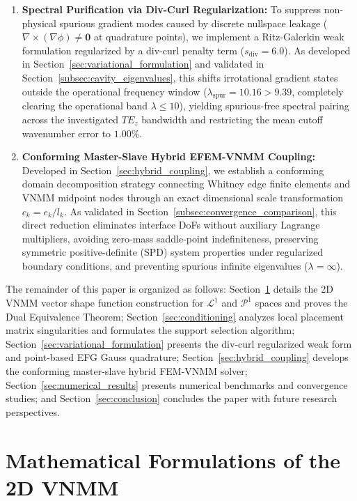 \documentclass[preprint,12pt]{elsarticle}
\begin{document}
\begin{enumerate}
    \item \textbf{Spectral Purification via Div-Curl Regularization:} To suppress non-physical spurious gradient modes caused by discrete nullspace leakage ($\nabla \times (\nabla \phi) \neq \mathbf{0}$ at quadrature points), we implement a Ritz-Galerkin weak formulation regularized by a div-curl penalty term ($s_{\mathrm{div}} = 6.0$). As developed in Section~\ref{sec:variational_formulation} and validated in Section~\ref{subsec:cavity_eigenvalues}, this shifts irrotational gradient states outside the operational frequency window ($\lambda_{\mathrm{spur}} = 10.16 > 9.39$, completely clearing the operational band $\lambda \le 10$), yielding spurious-free spectral pairing across the investigated $TE_z$ bandwidth and restricting the mean cutoff wavenumber error to $1.00\%$.
    
    \item \textbf{Conforming Master-Slave Hybrid EFEM-VNMM Coupling:} Developed in Section~\ref{sec:hybrid_coupling}, we establish a conforming domain decomposition strategy connecting Whitney edge finite elements and VNMM midpoint nodes through an exact dimensional scale transformation $c_k = e_k / l_k$. As validated in Section~\ref{subsec:convergence_comparison}, this direct reduction eliminates interface DoFs without auxiliary Lagrange multipliers, avoiding zero-mass saddle-point indefiniteness, preserving symmetric positive-definite (SPD) system properties under regularized boundary conditions, and preventing spurious infinite eigenvalues ($\lambda = \infty$).
\end{enumerate}


The remainder of this paper is organized as follows: Section~\ref{sec:formulations} details the 2D VNMM vector shape function construction for $\mathcal{L}^1$ and $\mathcal{P}^1$ spaces and proves the Dual Equivalence Theorem; Section~\ref{sec:conditioning} analyzes local placement matrix singularities and formulates the support selection algorithm; Section~\ref{sec:variational_formulation} presents the div-curl regularized weak form and point-based EFG Gauss quadrature; Section~\ref{sec:hybrid_coupling} develops the conforming master-slave hybrid FEM-VNMM solver; Section~\ref{sec:numerical_results} presents numerical benchmarks and convergence studies; and Section~\ref{sec:conclusion} concludes the paper with future research perspectives.

\section{Mathematical Formulations of the 2D VNMM}
\label{sec:formulations}
\end{document}
